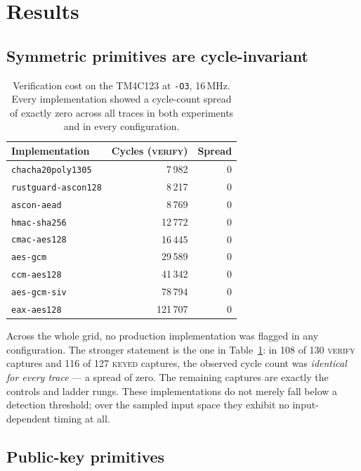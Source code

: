 \documentclass[11pt,a4paper]{article}
\begin{document}
\section{Results}
\label{sec:results}

\subsection{Symmetric primitives are cycle-invariant}

\begin{table}[t]
\centering
\caption{Verification cost on the TM4C123 at \texttt{-O3}, 16\,MHz. Every
implementation showed a cycle-count spread of exactly zero across all traces in
both experiments and in every configuration.}
\label{tab:cycles}
\begin{tabular}{lrr}
\toprule
Implementation & Cycles (\textsc{verify}) & Spread \\
\midrule
\texttt{chacha20poly1305} & 7\,982 & 0 \\
\texttt{rustguard-ascon128} & 8\,217 & 0 \\
\texttt{ascon-aead} & 8\,769 & 0 \\
\texttt{hmac-sha256} & 12\,772 & 0 \\
\texttt{cmac-aes128} & 16\,445 & 0 \\
\texttt{aes-gcm} & 29\,589 & 0 \\
\texttt{ccm-aes128} & 41\,342 & 0 \\
\texttt{aes-gcm-siv} & 78\,794 & 0 \\
\texttt{eax-aes128} & 121\,707 & 0 \\
\bottomrule
\end{tabular}
\end{table}

Across the whole grid, no production implementation was flagged in any
configuration. The stronger statement is the one in Table~\ref{tab:cycles}:
in 108 of 130 \textsc{verify} captures and 116 of 127 \textsc{keyed} captures,
the observed cycle count was \emph{identical for every trace} --- a spread of
zero. The remaining captures are exactly the controls and ladder rungs. These
implementations do not merely fall below a detection threshold; over the sampled
input space they exhibit no input-dependent timing at all.

\subsection{Public-key primitives}
\end{document}
